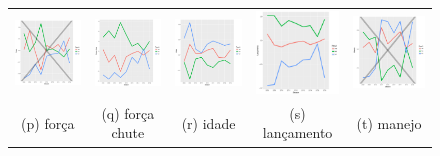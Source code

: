 \documentclass[doc,apacite,oneside,a4paper,12pt]{apa6}
\begin{document}
\begin{figure}
\begin{tabular}{ccccc}
  \includegraphics[width=25mm]{forca_result} & \includegraphics[width=25mm]{forcachute_result}  &   \includegraphics[width=25mm]{idade_result} &
  \includegraphics[width=25mm]{lancamento_result}  & \includegraphics[width=25mm]{manejo_result}  \\
 \scriptsize{(p) força} & \scriptsize{(q) força chute } & \scriptsize{(r) idade} & \scriptsize{(s) lançamento} & \scriptsize{(t) manejo}\\[3pt]
 

\end{tabular}
\end{figure}
\end{document}
